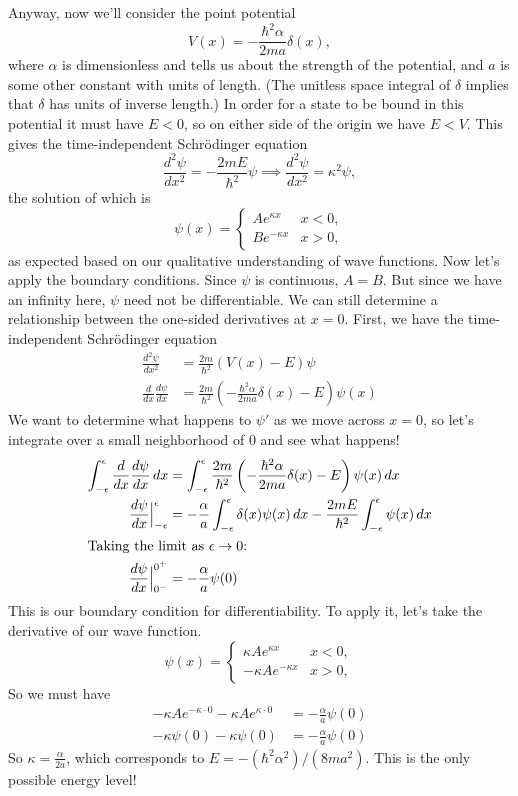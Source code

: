 \documentclass[../p052main.tex]{subfiles}
\begin{document}
Anyway, now we'll consider the point potential
\[ V(x) = -\frac{\hbar^2 \alpha}{2ma} \delta(x), \]
where $\alpha$ is dimensionless and tells us about the strength of the potential, and $a$ is some other constant with units of length.
(The unitless space integral of $\delta$ implies that $\delta$ has units of inverse length.)
In order for a state to be bound in this potential it must have $E < 0$, so on either side of the origin we have $E < V$.
This gives the time-independent Schrödinger equation
\[ \frac{d^2 \psi}{d x^2} = -\frac{2mE}{\hbar^2} \psi \implies \frac{d^2 \psi}{d x^2} = \kappa^2 \psi, \]
the solution of which is
\[ \psi(x) = \begin{cases} Ae^{\kappa x} & x < 0, \\ Be^{-\kappa x} & x > 0, \end{cases} \]
as expected based on our qualitative understanding of wave functions.
Now let's apply the boundary conditions.
Since $\psi$ is continuous, $A = B$.
But since we have an infinity here, $\psi$ need not be differentiable.
We can still determine a relationship between the one-sided derivatives at $x=0$.
First, we have the time-independent Schrödinger equation
\begin{align*}
    \frac{d^2 \psi}{d x^2} &= \frac{2m}{\hbar^2} \left( V(x) - E \right) \psi \\
    \frac{d}{dx} \frac{d\psi}{dx} &= \frac{2m}{\hbar^2} \left( -\frac{\hbar^2 \alpha}{2ma} \delta(x) - E \right) \psi(x)
\end{align*}
We want to determine what happens to $\psi'$ as we move across $x=0$, so let's integrate over a small neighborhood of 0 and see what happens!
\begin{align*}
    \int_{-\epsilon}^{\epsilon} \frac{d}{dx} \frac{d\psi}{dx} \,dx &= \int_{-\epsilon}^{\epsilon} \frac{2m}{\hbar^2} \left( -\frac{\hbar^2 \alpha}{2ma} \delta(x) - E \right) \psi(x) \,dx \\
    \frac{d\psi}{dx} \Big|_{-\epsilon}^\epsilon &= -\frac{\alpha}{a} \int_{-\epsilon}^{\epsilon} \delta(x) \psi(x) \,dx - \frac{2mE}{\hbar^2} \int_{-\epsilon}^{\epsilon} \psi(x) \,dx \\
    \intertext{Taking the limit as $\epsilon \to 0$:}
    \frac{d\psi}{dx}\Big|_{0^-}^{0^+} &= -\frac{\alpha}{a}\psi(0)
\end{align*}
This is our boundary condition for differentiability.
To apply it, let's take the derivative of our wave function.
\[ \psi(x) = \begin{cases} \kappa Ae^{\kappa x} & x < 0, \\ -\kappa Ae^{-\kappa x} & x > 0, \end{cases} \]
So we must have
\begin{align*}
    -\kappa Ae^{-\kappa \cdot 0} - \kappa A e^{\kappa \cdot 0} &= -\frac{\alpha}{a}\psi(0) \\
    -\kappa \psi(0) - \kappa \psi(0) &= -\frac{\alpha}{a}\psi(0)
\end{align*}
So $\kappa = \frac{\alpha}{2a}$, which corresponds to $E = -(\hbar^2 \alpha^2) / (8ma^2)$.
This is the only possible energy level!
\end{document}
